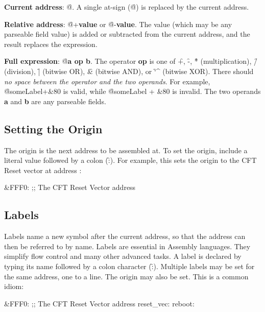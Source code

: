 \begin{description}

\item{\bfseries Current address}: \f{@}. A single at-sign (\f{@}) is replaced by the
  current address.

\item{\bfseries Relative address}: \f{@+{\bfseries value}} or \f{@-{\bfseries value}}. The value
  (which may be any parseable field value) is added or subtracted from the
  current address, and the result replaces the expression.

\item{\bfseries Full expression}: \f{@{\bfseries a op b}}. The operator {\bfseries op} is one of
  \f{+}, \f{-}, \f{*} (multiplication), \f{/} (division), \f{|} (bitwise OR),
  \f{\&} (bitwise AND), or \f{\char`\^} (bitwise XOR). There should {\em no space
    between the operator and the two operands}. For example, \f{@someLabel+\&80}
  is valid, while \f{@someLabel + \&80} is invalid. The two operands {\bfseries a} and
  {\bfseries b} are any parseable fields.

\end{description}

\subsection{Setting the Origin}

The origin is the next address to be assembled at. To set the origin, include a
literal value followed by a colon (\f{:}). For example, this sets the origin to
the CFT Reset vector at address :

\begin{cftasmcode}
&FFF0:       ;; The CFT Reset Vector address
\end{cftasmcode}

\subsection{Labels}

Labels name a new symbol after the current address, so that the address can
then be referred to by name. Labels are essential in Assembly languages. They
simplify flow control and many other advanced tasks. A label is declared by
typing its name followed by a colon character (\f{:}). Multiple labels may be
set for the same address, one to a line. The origin may also be set. This is a
common idiom:

\begin{cftasmcode}
&FFF0:       ;; The CFT Reset Vector address
reset_vec:
reboot:
\end{cftasmcode}

